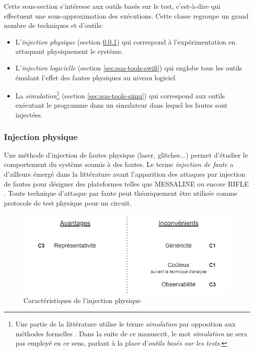             Cette sous-section s'intéresse aux outils basés sur le test, c'est-à-dire qui effectuent une sous-approximation des exécutions.
            Cette classe regroupe un grand nombre de techniques et d'outils:
            \begin{itemize}
                \item L'\textit{injection physique} (section \ref{sec:soa-tools-physic}) qui correspond à l'expérimentation en attaquant physiquement le système.
                \item L'\textit{injection logicielle} (section \ref{sec:soa-tools-swifi}) qui englobe tous les outils émulant l'effet des fautes physiques au niveau logiciel.
                \item La \textit{simulation}\footnote{Une partie de la littérature utilise le terme \textit{simulation} par opposition aux méthodes formelles \cite{kooli2014survey, Heydemann/HDR17}. Dans la suite de ce manuscrit, le mot \textit{simulation} ne sera pas employé en ce sens, parlant à la place d'\textit{outils basés sur les tests}.} (section \ref{sec:soa-tools-simu}) qui correspond aux outils exécutant le programme dans un simulateur dans lequel les fautes sont injectées.
            \end{itemize}        
        
            \subsubsection{Injection physique}
            \label{sec:soa-tools-physic}
            
                Une méthode d'injection de fautes physique (laser, glitches...) permet d'étudier le comportement du système soumis à des fautes. 
                Le terme \textit{injection de faute} a d'ailleurs émergé dans la littérature avant l'apparition des attaques par injection de fautes pour désigner des plateformes telles que MESSALINE \cite{Arlat/TSE90} ou encore RIFLE \cite{Madeira/DCC94}.
                Toute technique d'attaque par faute peut théoriquement être utilisée comme protocole de test physique pour un circuit.  
                
                \begin{figure}[hbt]\centering
                  \includegraphics[scale=.45]{ch2-background/img/advantages-physics.drawio.png}
                  \caption{Caractéristiques de l'injection physique}
                  \label{fig:soa-tools-scheme-physic}
                \end{figure}
                

